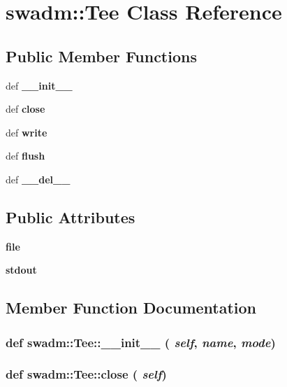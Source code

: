 \section{swadm::Tee Class Reference}
\label{classswadm_1_1Tee}
\subsection*{Public Member Functions}
\begin{CompactItemize}
\item 
def {\bf \_\-\_\-init\_\-\_\-}
\item 
def {\bf close}
\item 
def {\bf write}
\item 
def {\bf flush}
\item 
def {\bf \_\-\_\-del\_\-\_\-}
\end{CompactItemize}
\subsection*{Public Attributes}
\begin{CompactItemize}
\item 
{\bf file}
\item 
{\bf stdout}
\end{CompactItemize}


\subsection{Member Function Documentation}
\subsubsection{\setlength{\rightskip}{0pt plus 5cm}def swadm::Tee::\_\-\_\-init\_\-\_\- ( {\em self},  {\em name},  {\em mode})}\label{classswadm_1_1Tee_d29711bbecab87269a7c787e4f3e6618}


\subsubsection{\setlength{\rightskip}{0pt plus 5cm}def swadm::Tee::close ( {\em self})}\label{classswadm_1_1Tee_b92c525cd1a84ec238870ae7a9c0bcee}


